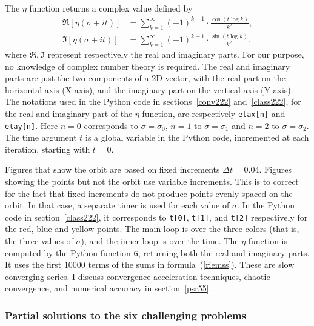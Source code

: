 \documentclass[oneside,10pt]{book}
\begin{document}
\noindent The $\eta$ function returns a complex value  defined by
\begin{equation}\label{riemss}
\begin{aligned}
 \Re[\eta(\sigma+it)] & =\sum_{k=1}^\infty (-1)^{k+1}\cdot \frac{\cos(t\log k)}{k^\sigma}, \\ %
 \Im[\eta(\sigma+it)] & =\sum_{k=1}^\infty (-1)^{k+1}\cdot \frac{\sin(t\log k)}{k^\sigma}, %
\end{aligned}
\end{equation}
where $\Re,\Im$ represent respectively the real and imaginary parts. For our purpose, no knowledge of complex number theory is required. The real and
imaginary parts are just the two components of a 2D vector, with the real part on the horizontal axis (X-axis), and the imaginary part on the vertical axis (Y-axis).
The notations used in the Python code in sections~\ref{conv222} and~\ref{class222}, for the real and imaginary part of the $\eta$ function, are
respectively \texttt{etax[n]} and \texttt{etay[n]}. Here $n=0$  corresponds to $\sigma=\sigma_0$, $n=1$ to $\sigma=\sigma_1$ and $n=2$ to $\sigma=\sigma_2$. The time argument $t$ is a global variable in the Python code, incremented at each iteration, starting with $t=0$.

Figures that show the orbit are based on fixed increments $\Delta t=0.04$. Figures showing the points but not the orbit use variable
increments. This is to correct for the fact that fixed increments do not produce points evenly spaced on the orbit. In that case, a separate timer is
used for each value of $\sigma$. In the Python code in section~\ref{class222}, it corresponds
to \texttt{t[0]}, \texttt{t[1]}, and \texttt{t[2]} respectively for the red, blue and yellow points. The main loop is over the three colors (that is, the three values of $\sigma$), and the
inner loop is over the time. The $\eta$ function is computed by the Python function \texttt{G}, returning both the real and imaginary parts. It uses
the first $\num{10000}$ terms of the sums in formula~(\ref{riemss}).
These are slow converging series. I discuss convergence acceleration techniques, chaotic convergence, and numerical accuracy in section~\ref{psr55}.

\subsubsection{Partial solutions to the six challenging problems}\label{psrr}
\end{document}
